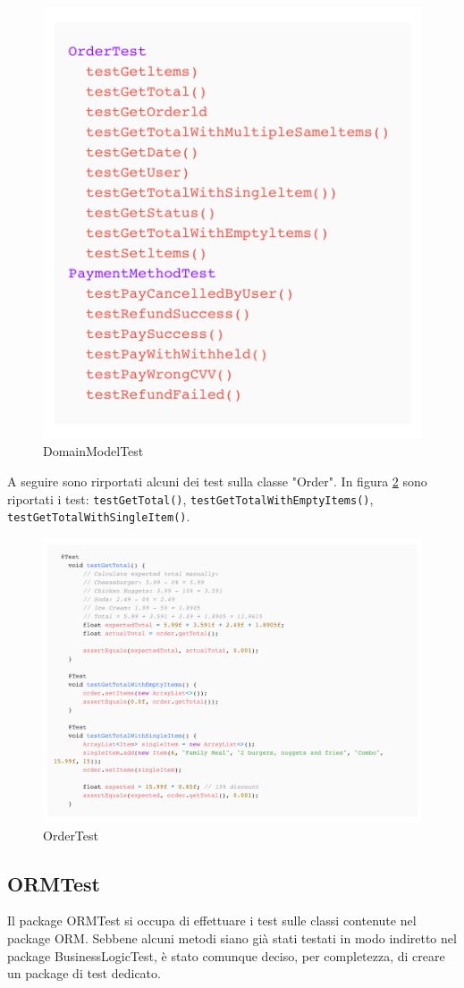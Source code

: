 \documentclass{article}
\begin{document}
\begin{figure}[!h]
    \centering
    \includegraphics[width=0.5\linewidth]{imgs/snippets/DomainModelTest.png}
    \caption{DomainModelTest}
    \label{DomainModelTest}
\end{figure}

A seguire sono rirportati alcuni dei test sulla classe "Order". In figura \ref{OrderTest} sono riportati i test: \texttt{testGetTotal()}, \texttt{testGetTotalWithEmptyItems()}, \texttt{testGetTotalWithSingleItem()}.

\begin{figure}[H]
    \centering
    \includegraphics[width=1.0\linewidth]{imgs/snippets/OrderTest.png}
    \caption{OrderTest}
    \label{OrderTest}
\end{figure}

\subsection{ORMTest}
Il package ORMTest si occupa di effettuare i test sulle classi contenute nel package ORM. Sebbene alcuni metodi siano già stati testati in modo indiretto nel package BusinessLogicTest, è stato comunque deciso, per completezza, di creare un package di test dedicato.
\end{document}

